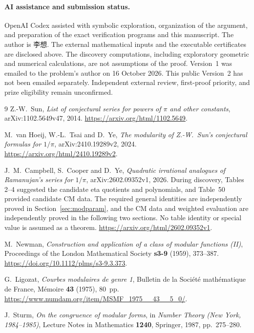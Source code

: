 \documentclass[11pt,a4paper]{article}
\theoremstyle{remark}
\begin{document}
\paragraph{AI assistance and submission status.}
OpenAI Codex assisted with symbolic exploration, organization of the
argument, and preparation of the exact verification programs and this
manuscript. The author is 李想. The external mathematical
inputs and the executable certificates are disclosed above. The discovery
computations, including exploratory geometric and numerical calculations,
are not assumptions of the proof. Version~1 was emailed to the problem's
author on 16 October 2026. This public Version~2 has not been emailed
separately. Independent external review, first-proof priority, and prize
eligibility remain unconfirmed.

\begin{thebibliography}{9}
Z.-W.~Sun, \emph{List of conjectural series for powers of $\pi$ and other
constants}, arXiv:1102.5649v47, 2014.
\url{https://arxiv.org/html/1102.5649}.

M.~van Hoeij, W.-L.~Tsai and D.~Ye,
\emph{The modularity of Z.-W.~Sun's conjectural formulas for $1/\pi$},
arXiv:2410.19289v2, 2024.
\url{https://arxiv.org/html/2410.19289v2}.

J.~M.~Campbell, S.~Cooper and D.~Ye,
\emph{Quadratic irrational analogues of Ramanujan's series for $1/\pi$},
arXiv:2602.09352v1, 2026. During discovery, Tables 2--4
suggested the candidate eta quotients and polynomials, and Table~50
provided candidate CM data. The required general identities are
independently proved in Section~\ref{sec:modparam}, and the CM data and
weighted evaluation are independently proved in the following two
sections. No table identity or special value is assumed as a theorem.
\url{https://arxiv.org/html/2602.09352v1}.

M.~Newman, \emph{Construction and application of a class of modular
functions (II)}, Proceedings of the London Mathematical Society
\textbf{s3-9} (1959), 373--387.
\url{https://doi.org/10.1112/plms/s3-9.3.373}.

G.~Ligozat, \emph{Courbes modulaires de genre 1},
Bulletin de la Soci\'et\'e math\'ematique de France, M\'emoire
\textbf{43} (1975), 80~pp.
\url{https://www.numdam.org/item/MSMF_1975__43__5_0/}.

J.~Sturm, \emph{On the congruence of modular forms}, in
\emph{Number Theory (New York, 1984--1985)}, Lecture Notes in Mathematics
\textbf{1240}, Springer, 1987, pp.~275--280.
\end{thebibliography}
\end{document}
